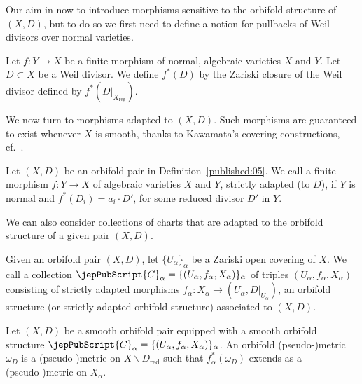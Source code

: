 Our aim in now to introduce morphisms sensitive to the orbifold structure of $(X,D)$, but to do so 
we first need to define a notion for pullbacks of Weil divisors over normal varieties. 

\begin{definition}\label{published:06}
Let $f: Y\to X$ be a finite morphism of normal, algebraic varieties $X$ and $Y$. 
Let $D\subset X$ be a Weil divisor. We define 
$f^*(D)$ by the Zariski closure of the Weil divisor defined by $f^*(D|_{X_{\operatorname{reg}}})$.
\end{definition}

We now turn to morphisms adapted to $(X,D)$. Such morphisms are guaranteed to 
exist whenever $X$ is smooth, thanks to Kawamata's covering constructions, 
cf.~\cite[Prop.~4.1.12]{pubref22}. 

\begin{definition}\label{published:07}
Let $(X,D)$ be an orbifold pair in Definition~\ref{published:05}. We call a finite morphism 
$f: Y \to X$ of algebraic varieties $X$ and $Y$, strictly adapted (to $D$), if $Y$ is normal and 
$f^*(D_i) = a_i \cdot D'$, for some reduced divisor $D'$ in $Y$. 

\end{definition}


We can also consider collections of charts that are adapted to the orbifold 
structure of a given pair $(X,D)$. 

\begin{definition}\label{published:08}
Given an orbifold pair $(X,D)$, let $\{ U_{\alpha}\}_{\alpha}$ be a Zariski open covering of $X$. 
We call a collection $\jepPubScript{C}_{\alpha} = \{ (U_{\alpha}, f_{\alpha}, X_{\alpha} )\}_{\alpha}$ 
of triples $(U_{\alpha}, f_{\alpha}, X_{\alpha})$
consisting of strictly adapted morphisms $f_{\alpha}: X_{\alpha} \to (U_{\alpha}, D|_{U_{\alpha}})$, 
an orbifold structure (or strictly adapted orbifold structure) associated to $(X,D)$.

\end{definition}

\begin{definition}
Let $(X,D)$ be a smooth orbifold pair equipped with a smooth orbifold structure 
$\jepPubScript{C}_{\alpha} = \{ (U_{\alpha}, f_{\alpha}, X_{\alpha})  \}_{\alpha}$. An orbifold  (pseudo-)metric $\omega_D$ is a (pseudo-)metric on $X\smallsetminus D_{\text{red}}$ such that $f_{\alpha}^*(\omega_D)$ extends as a (pseudo-)metric on $X_\alpha$.
\end{definition}

